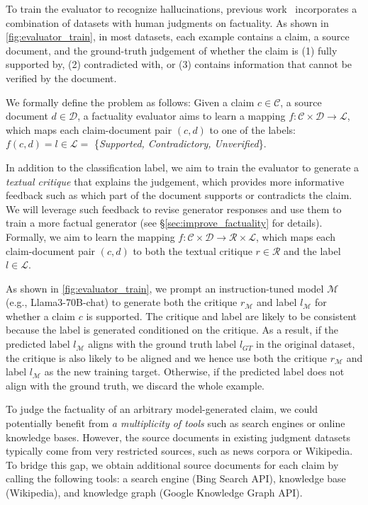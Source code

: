 To train the evaluator to recognize hallucinations, previous work~\citep{FLAMe} incorporates a combination of datasets with human judgments on factuality. As shown in \autoref{fig:evaluator_train}, in most datasets, each example contains a claim, a source document, and the ground-truth judgement of whether the claim is (1) fully supported by, (2) contradicted with, or (3) contains information that cannot be verified by the document.



We formally define the problem as follows:
Given a claim $c \in \mathcal{C}$, a source document $d \in \mathcal{D}$, a factuality evaluator aims to learn a mapping $f: \mathcal{C} \times \mathcal{D} \rightarrow \mathcal{L}$, which maps each claim-document pair $(c,d)$ to one of the labels:  
$f(c,d) = l \in \mathcal{L} =$ \{\textit{Supported, Contradictory, Unverified}\}.



In addition to the classification label, we aim to train the evaluator to generate a \textit{textual critique} that explains the judgement, which provides more informative feedback such as which part of the document supports or contradicts the claim. We will leverage such feedback to revise generator responses and use them to train a more factual generator (see \S\ref{sec:improve_factuality} for details).
Formally, we aim to learn the mapping $f: \mathcal{C} \times \mathcal{D} \rightarrow \mathcal{R} \times \mathcal{L}$, which maps each claim-document pair $(c,d)$ to both the textual critique $r \in \mathcal{R}$ and the label $l \in \mathcal{L}$.


As shown in \autoref{fig:evaluator_train}, we prompt an instruction-tuned model $\mathcal{M}$ (e.g., Llama3-70B-chat) to generate both the critique $r_\mathcal{M}$ and label $l_\mathcal{M}$ for whether a claim $c$ is supported. The critique and label are likely to be consistent because the label is generated conditioned on the critique. As a result, if the predicted label $l_\mathcal{M}$ aligns with the ground truth label $l_{GT}$ in the original dataset, the critique is also likely to be aligned and we hence use both the critique $r_\mathcal{M}$ and label $l_\mathcal{M}$ as the new training target. Otherwise, if the predicted label does not align with the ground truth, we discard the whole example.



To judge the factuality of an arbitrary model-generated claim, we could potentially benefit from \textit{a multiplicity of tools} such as search engines or online knowledge bases. However, the source documents in existing judgment datasets typically come from very restricted sources, such as news corpora or Wikipedia.
To bridge this gap, we obtain additional source documents for each claim by calling the following tools: a search engine (Bing Search API), knowledge base (Wikipedia), and knowledge graph (Google Knowledge Graph API).


